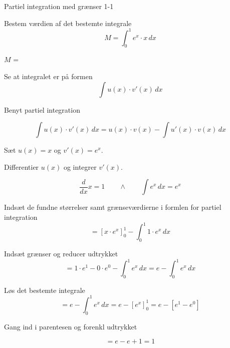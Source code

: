 \documentclass{article}
\begin{document}
\tableofcontents

\newpage

\begin{exercise}{Partiel integration med grænser 1-1}
	
	
	Bestem værdien af det bestemte integrale
	\[
	M = \int_0^1 e^x \cdot x \, dx
	\]
	
	$M$ =  
	
	
	\hint
	
	Se at integralet er på formen
	\[
	\int u(x) \cdot v'(x) \, dx
	\]
	
	\hint
	
	Benyt partiel integration
	
	\hint
	\[
	\int u(x) \cdot v'(x)\, dx = u(x) \cdot v(x) - \int u'(x) \cdot v(x) \, dx
	\]
	\hint
	
	Sæt $u(x) = x$ og $v'(x) = e^x$.
	
	
	\hint
	
	Differentier $u(x)$ og integrer $v'(x)$.
	
	\hint
	\[
	\frac{d}{dx}x = 1 \qquad \wedge \qquad \int e^x \, dx = e^x
	\]
	
	\hint
	
	Indsæt de fundne størrelser samt grænseværdierne i formlen for partiel integration 
	\[
	= \left[x \cdot e^x\right]_{0}^{1} - \int_{0}^{1} 1 \cdot e^x \, dx
	\]
	
	\hint
	
	Indsæt grænser og reducer udtrykket
	\[
	= 1 \cdot e^1 - 0 \cdot e^0  - \int_{0}^{1} e^x \, dx = e - \int_{0}^{1} e^x \, dx
	\]
	
	\hint
	Løs det bestemte integrale
	\[
	= e - \int_{0}^{1} e^x \, dx = e - \left[ e^x  \right]_{0}^{1} = e - \left[ e^1 - e^0 \right]
	\]
	
	\hint
	Gang ind i parentesen og forenkl udtrykket
	
	\hint
	\[
	= e  - e +1	 = 1	
	\]
	
	
	
\end{exercise}

\newpage
\end{document}
